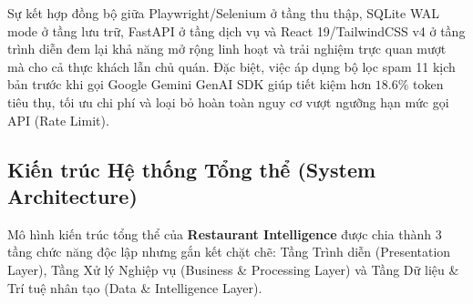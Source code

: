 \documentclass[12pt, a4paper]{article}
\begin{document}
Sự kết hợp đồng bộ giữa Playwright/Selenium ở tầng thu thập, SQLite WAL mode ở tầng lưu trữ, FastAPI ở tầng dịch vụ và React 19/TailwindCSS v4 ở tầng trình diễn đem lại khả năng mở rộng linh hoạt và trải nghiệm trực quan mượt mà cho cả thực khách lẫn chủ quán. Đặc biệt, việc áp dụng bộ lọc spam 11 kịch bản trước khi gọi Google Gemini GenAI SDK giúp tiết kiệm hơn $18.6\%$ token tiêu thụ, tối ưu chi phí và loại bỏ hoàn toàn nguy cơ vượt ngưỡng hạn mức gọi API (Rate Limit).


\subsection{Kiến trúc Hệ thống Tổng thể (System Architecture)}
Mô hình kiến trúc tổng thể của \textbf{Restaurant Intelligence} được chia thành 3 tầng chức năng độc lập nhưng gắn kết chặt chẽ: Tầng Trình diễn (Presentation Layer), Tầng Xử lý Nghiệp vụ (Business \& Processing Layer) và Tầng Dữ liệu \& Trí tuệ nhân tạo (Data \& Intelligence Layer).
\end{document}
